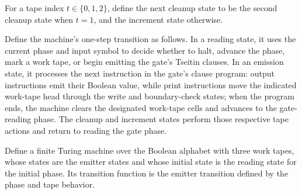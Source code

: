 \begin{definition}
\label{BoolCircuit.CktSatReduction.Emitter.clNext}
\leanok
{}
For a tape index $t\in\{0,1,2\}$, define the next cleanup state to be the second cleanup
state when $t=1$, and the increment state otherwise.
\end{definition}

\begin{definition}
\label{BoolCircuit.CktSatReduction.Emitter.tr}
\leanok
{}
Define the machine’s one-step transition as follows. In a reading state, it uses the
current phase and input symbol to decide whether to halt, advance the phase, mark a work
tape, or begin emitting the gate’s Tseitin clauses. In an emission state, it processes
the next instruction in the gate’s clause program: output instructions emit their
Boolean value, while print instructions move the indicated work-tape head through the
write and boundary-check states; when the program ends, the machine clears the
designated work-tape cells and advances to the gate-reading phase. The cleanup and
increment states perform those respective tape actions and return to reading the gate
phase.
\end{definition}

\begin{definition}
\label{BoolCircuit.CktSatReduction.Emitter.emTM}
\leanok
{}
Define a finite Turing machine over the Boolean alphabet with three work tapes, whose
states are the emitter states and whose initial state is the reading state for the
initial phase. Its transition function is the emitter transition defined by the phase
and tape behavior.
\end{definition}


